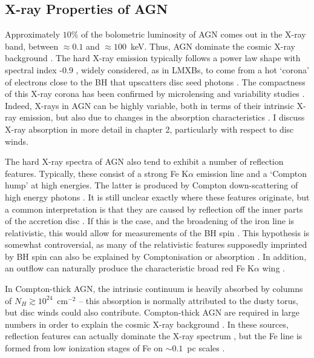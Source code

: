 \subsection{X-ray Properties of AGN}

Approximately $10\%$ of the bolometric luminosity of AGN
comes out in the X-ray band, between $\approx0.1$ and $\approx100$~keV.
Thus, AGN dominate the cosmic X-ray background \citep{madau1994}.
The hard X-ray emission typically follows a power law shape with spectral
index -0.9 \citep[e.g.][]{koratkar1999}, 
widely considered, as in LMXBs, to come from a hot `corona' of 
electrons close to the BH that upscatters disc seed photons
\citep[e.g.][]{haardt1991}. The compactness of this X-ray corona
has been confirmed by microlensing \citep{chartas2009, dai2010} 
and variability studies \citep{green1993,crenshaw1996,risaliti2007,emmanoulopoulos2014}. 
Indeed, X-rays in AGN can be highly variable, both in terms of their intrinsic 
X-ray emission, but also due to changes in the absorption characteristics 
\citep{risaliti2002,miller2008,connolly2014}.
I discuss X-ray absorption in more detail in chapter 2, particularly with respect to disc winds.

The hard X-ray spectra of AGN also tend to exhibit a number of reflection features. 
Typically, these consist of a strong Fe K$\alpha$ emission line and a `Compton hump'
at high energies. The latter is produced by Compton down-scattering 
of high energy photons \citep{pounds1989,nandra1994}.
It is still unclear exactly where these features originate, 
but a common interpretation is that they are caused by 
reflection off the inner parts of the accretion disc 
\citep{fabian1995,iwasawa1996b,reynolds1999}.
If this is the case, and the broadening of the iron line is relativistic,
this would allow for measurements of the BH spin 
\citep{laor1991,iwasawa1996a,dabrowski1997}.
This hypothesis is somewhat controversial, as 
many of the relativistic features supposedly imprinted by BH spin can also be explained
by Comptonisation or absorption \citep[e.g.][]{misra1998,miller2013}.
In addition, an outflow can naturally produce the characteristic 
broad red Fe K$\alpha$ wing \citep{sim2010}.

In Compton-thick AGN, the intrinsic continuum is heavily absorbed by columns of
$N_H\gtrsim10^{24}$~cm$^{-2}$ -- this absorption is normally attributed to the 
dusty torus, 
but disc winds could also contribute. Compton-thick AGN are required 
in large numbers in order to explain the cosmic X-ray background \citep{setti1989}.
In these sources, reflection features can actually dominate the X-ray spectrum 
\citep{alexander2011,gandhi2013}, but the Fe line is formed from low ionization
stages of Fe on $\sim0.1$~pc scales \citep{gandhi2015}.


